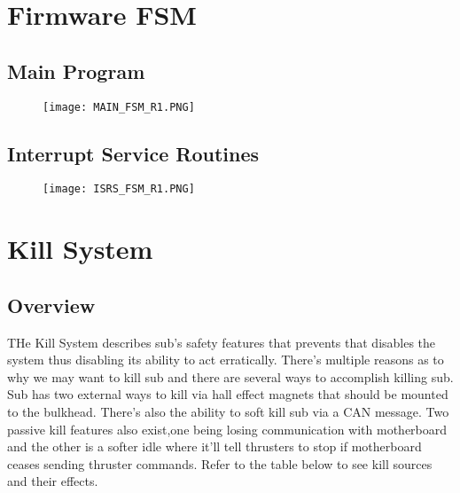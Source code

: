 \documentclass[a4paper,12pt,oneside,pdflatex,italian,final,twocolumn]{article}
\begin{document}
\pagebreak
\raggedright
\section{Firmware FSM}
\vspace{-5cm}
\raggedright
\subsection{Main Program}
\vspace{-15cm}
\centering
\begin{figure}[h]
\centering
\texttt{[image: MAIN\_FSM\_R1.PNG]}
\end{figure}

\pagebreak
\raggedright
\subsection{Interrupt Service Routines}
\vspace{-10cm}
\centering
\begin{figure}[h]
\centering
\texttt{[image: ISRS\_FSM\_R1.PNG]}
\end{figure}


\pagebreak

\raggedright
\section{Kill System}
\vspace{-1cm}
\subsection{Overview}
\vspace{-1cm}
THe Kill System describes sub's safety features that prevents that disables the system thus disabling its ability to act erratically. There's multiple reasons as to why we may want to kill sub and there are several ways to accomplish killing sub. Sub has two external ways to kill via hall effect magnets that should be mounted to the bulkhead. There's also the ability to soft kill sub via a CAN message. Two passive kill features also exist,one being losing communication with motherboard and the other is a softer idle where it'll tell thrusters to stop if motherboard ceases sending thruster commands. Refer to the table below to see kill sources and their effects. 

\vspace{-4cm}
\end{document}
